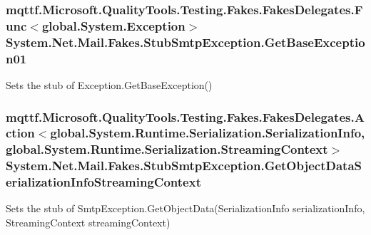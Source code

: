 \hypertarget{class_system_1_1_net_1_1_mail_1_1_fakes_1_1_stub_smtp_exception_aa6e4d1d375c23c9096b2dfd36239941f}{
\subsubsection[{Get\-Base\-Exception01}]{\setlength{\rightskip}{0pt plus 5cm}mqttf.\-Microsoft.\-Quality\-Tools.\-Testing.\-Fakes.\-Fakes\-Delegates.\-Func$<$global.\-System.\-Exception$>$ System.\-Net.\-Mail.\-Fakes.\-Stub\-Smtp\-Exception.\-Get\-Base\-Exception01}}\label{class_system_1_1_net_1_1_mail_1_1_fakes_1_1_stub_smtp_exception_aa6e4d1d375c23c9096b2dfd36239941f}


Sets the stub of Exception.\-Get\-Base\-Exception()

\hypertarget{class_system_1_1_net_1_1_mail_1_1_fakes_1_1_stub_smtp_exception_a5c6e0e765176879953eced5d3538cd5b}{
\subsubsection[{Get\-Object\-Data\-Serialization\-Info\-Streaming\-Context}]{\setlength{\rightskip}{0pt plus 5cm}mqttf.\-Microsoft.\-Quality\-Tools.\-Testing.\-Fakes.\-Fakes\-Delegates.\-Action$<$global.\-System.\-Runtime.\-Serialization.\-Serialization\-Info, global.\-System.\-Runtime.\-Serialization.\-Streaming\-Context$>$ System.\-Net.\-Mail.\-Fakes.\-Stub\-Smtp\-Exception.\-Get\-Object\-Data\-Serialization\-Info\-Streaming\-Context}}\label{class_system_1_1_net_1_1_mail_1_1_fakes_1_1_stub_smtp_exception_a5c6e0e765176879953eced5d3538cd5b}


Sets the stub of Smtp\-Exception.\-Get\-Object\-Data(\-Serialization\-Info serialization\-Info, Streaming\-Context streaming\-Context)

